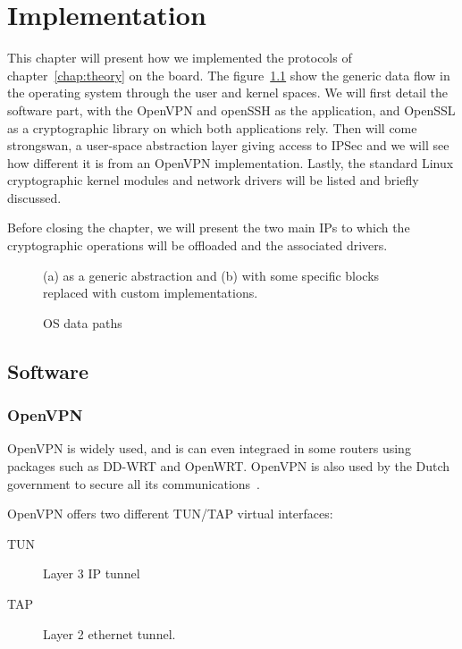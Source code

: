 \chapter{Implementation}
This chapter will present how we implemented the protocols of chapter~\ref{chap:theory} on the board.
The figure~\ref{fig:os-path-generic} show the generic data flow in the operating system through the user and kernel spaces.
We will first detail the software part, with the OpenVPN and openSSH as the application, and OpenSSL as a cryptographic library on which both applications rely.
Then will come strongswan, a user-space abstraction layer giving access to IPSec and we will see how different it is from an OpenVPN implementation.
Lastly, the standard Linux cryptographic kernel modules and network drivers will be listed and briefly discussed.

Before closing the chapter, we will present the two main IPs to which the cryptographic operations will be offloaded and the associated drivers.


\begin{figure}[ht]
\center
{}
\caption{OS data paths}{(a) as a generic abstraction and (b) with some specific blocks replaced with custom implementations.}
\label{fig:os-path-generic}
\end{figure}

\section{Software}

\subsection{OpenVPN}

OpenVPN is widely used, and is can even integraed in some routers using packages such as DD-WRT and OpenWRT.
OpenVPN is also used by the Dutch government to secure all its communications~\cite{openvpn-nl}.

OpenVPN offers two different TUN/TAP virtual interfaces:
\begin{description}
	\item[TUN] Layer 3 IP tunnel
	\item[TAP] Layer 2 ethernet tunnel.
\end{description}


